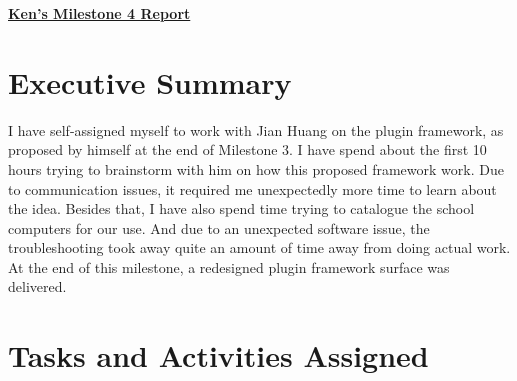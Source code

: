 \begin{center}
{\textbf{\underline{{Ken's Milestone 4 Report}}}}
\end{center}

\section*{Executive Summary}

I have self-assigned myself to work with Jian Huang on the plugin framework, as proposed by himself at the end of Milestone 3. I have spend about the first 10 hours trying to brainstorm with him on how this proposed framework work. Due to communication issues, it required me unexpectedly more time to learn about the idea. Besides that, I have also spend time trying to catalogue the school computers for our use. And due to an unexpected software issue, the troubleshooting took away quite an amount of time away from doing actual work. At the end of this milestone, a redesigned plugin framework surface was delivered. 

\section*{Tasks and Activities Assigned}

